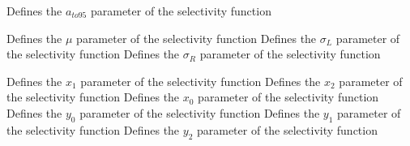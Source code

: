  {Defines the $a_{to95}$ parameter of the selectivity function}
\par\textbf{}\par
{} {Defines the $\mu$ parameter of the selectivity function}
 {Defines the $\sigma_L$ parameter of the selectivity function}
 {Defines the $\sigma_R$ parameter of the selectivity function}
\par\textbf{}\par
{} {Defines the $x_1$ parameter of the selectivity function}
 {Defines the $x_2$ parameter of the selectivity function}
 {Defines the $x_0$ parameter of the selectivity function}
 {Defines the $y_0$ parameter of the selectivity function}
 {Defines the $y_1$ parameter of the selectivity function}
 {Defines the $y_2$ parameter of the selectivity function}
